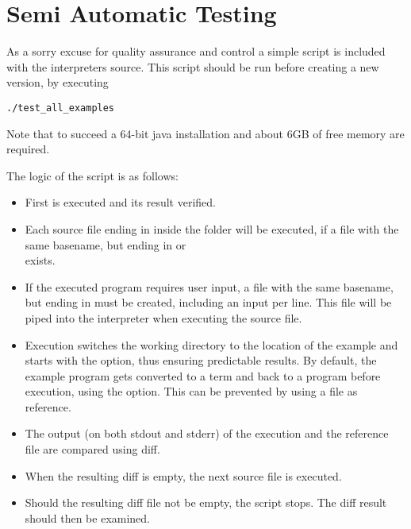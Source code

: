 \section{Semi Automatic Testing}\label{testing}

As a sorry excuse for quality assurance and control a simple  script is included with the interpreters source.
This script should be run before creating a new version, by executing

\begin{lstlisting}[frame=none,numbers=none]
./test_all_examples
\end{lstlisting}

Note that to succeed a 64-bit java installation and about 6GB of free memory are required.

The logic of the script is as follows:
\begin{itemize}
	\item First  is executed and its result verified.
	\item Each source file ending in  inside the  folder will be executed, if a file with the same basename, but ending in  or\\
	  exists.
	\item If the executed program requires user input, a file with the same basename, but ending in  must be created, including an input per line. This file will be piped into the interpreter when executing the source file.
	\item Execution switches the working directory to the location of the example and starts \setlX{} with the
	       option, thus ensuring predictable results. By default, the example program gets converted to a term and back to a program before execution, using the  option. This can be prevented by using a  file as reference.
	\item The output (on both stdout and stderr) of the execution and the reference file are compared using diff.
	\item When the resulting diff is empty, the next source file is executed.
	\item Should the resulting diff file not be empty, the script stops. The diff result should then be examined.
\end{itemize}

